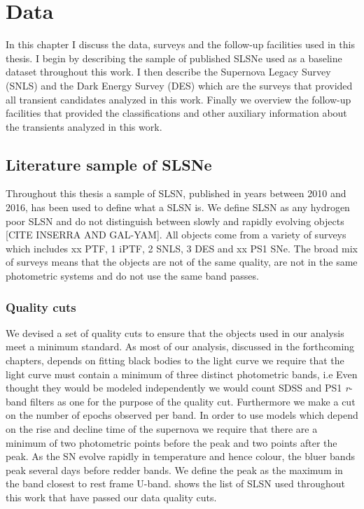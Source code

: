 
\chapter{Data} %
\label{Chapter2}

In this chapter I discuss the data, surveys and the follow-up facilities used in this thesis. I begin by describing the sample of published SLSNe used as a baseline dataset throughout this work. I then describe the Supernova Legacy Survey (SNLS) and the Dark Energy Survey (DES) which are the surveys that provided all transient candidates analyzed in this work. Finally we overview the follow-up facilities that provided the classifications and other auxiliary information about the transients analyzed in this work. 

\section{Literature sample of SLSNe}
Throughout this thesis a sample of SLSN, published in years between 2010 and 2016, has been used to define what a SLSN is. We define SLSN as any hydrogen poor SLSN and do not distinguish between slowly and rapidly evolving objects [CITE INSERRA AND GAL-YAM]. All objects come from a variety of surveys which includes xx PTF, 1 iPTF, 2 SNLS, 3 DES and xx PS1 SNe. The broad mix of surveys means that the objects are not of the same quality, are not in the same photometric systems and do not use the same band passes. 

\subsection{Quality cuts}
We devised a set of quality cuts to ensure that the objects used in our analysis meet a minimum standard. As most of our analysis, discussed in the forthcoming chapters, depends on fitting black bodies to the light curve we require that the light curve must contain a minimum of three distinct photometric bands, i.e Even thought they would be modeled independently we would count SDSS and PS1 \textit{r}-band filters as one for the purpose of the quality cut. Furthermore we make a cut on the number of epochs observed per band. In order to use models which depend on the rise and decline time of the supernova we require that there are a minimum of two photometric points before the peak and two points after the peak. As the SN evolve rapidly in temperature and hence colour, the bluer bands peak several days before redder bands. We define the peak as the maximum in the band closest to rest frame U-band.  shows the list of SLSN used throughout this work that have passed our data quality cuts. 

